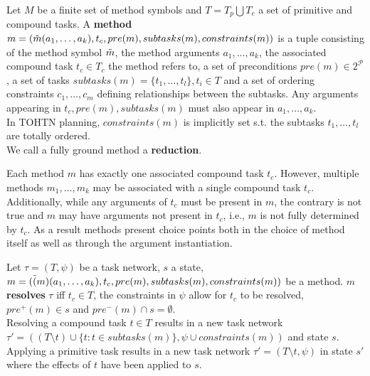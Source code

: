 \begin{definition} %
	Let $M$ be a finite set of method symbols and $T = T_p \bigcup T_c$ a set of primitive and compound tasks. A \textbf{method} $m = (\Tilde{m}(a_1, \ldots, a_k), t_c, pre(m), subtasks(m), constraints(m))$ is a tuple consisting of the method symbol $\Tilde{m}$, the method arguments $a_1, \ldots, a_k$, the associated compound task $t_c \in T_c$ the method refers to, a set of preconditions $pre(m) \in 2^{\mathcal{P}}$, a set of tasks $subtasks(m) = \{t_1, \ldots, t_l\}, t_i \in T$ and a set of ordering constraints $c_1, \ldots, c_m$ defining relationships between the subtasks. Any arguments appearing in $t_c, pre(m), subtasks(m)$ must also appear in $a_1, \ldots, a_k$.\\
	In TOHTN planning, $constraints(m)$ is implicitly set s.t. the subtasks $t_1, \ldots, t_l$ are totally ordered. \\
	We call a fully ground method a \textbf{reduction}.
\end{definition}
Each method $m$ has exactly one associated compound task $t_c$. However, multiple methods $m_1, \ldots, m_k$ may be associated with a single compound task $t_c$. Additionally, while any arguments of $t_c$ must be present in $m$, the contrary is not true and $m$ may have arguments not present in $t_c$, i.e., $m$ is not fully determined by $t_c$. As a result methods present choice points both in the choice of method itself as well as through the argument instantiation. \\


\begin{definition} %
	Let $\tau = (T, \psi)$ be a task network, $s$ a state, $m = (\Tilde(m)(a_1, \ldots, a_k), t_c, pre(m), subtasks(m), constraints(m))$ be a method. $m$ \textbf{resolves} $\tau$ iff $t_c \in T$, the constraints in $\psi$ allow for $t_c$ to be resolved, $pre^+(m) \in s$ and $pre^-(m) \cap s = \emptyset$. \\
	Resolving a compound task $t \in T$ results in a new task network $\tau' = ((T \setminus t) \cup \{t : t \in subtasks(m)\}, \psi \cup constraints(m))$ and state $s$. \\
	Applying a primitive task results in a new task network $\tau' = (T \setminus t, \psi)$ in state $s'$ where the effects of $t$ have been applied to $s$. 
\end{definition}

